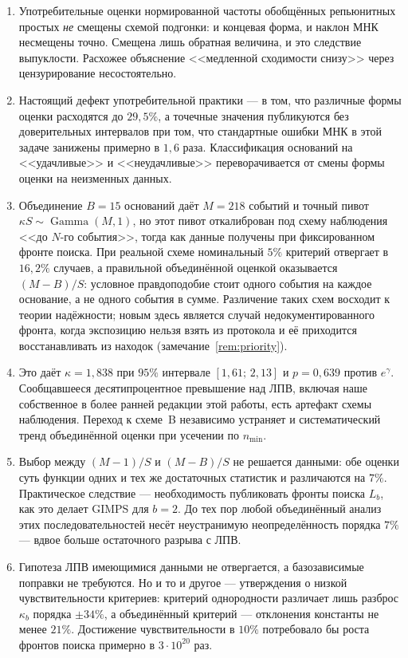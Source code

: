 \documentclass[11pt,a4paper]{article}
\theoremstyle{plain}
\theoremstyle{remark}
\newcommand{\eg}{e^{\gamma}}
\DeclareMathOperator{\Gam}{Gamma}
\begin{document}
\begin{enumerate}
\item Употребительные оценки нормированной частоты обобщённых репьюнитных простых
\emph{не} смещены схемой подгонки: и концевая форма, и наклон МНК несмещены точно.
Смещена лишь обратная величина, и это следствие выпуклости. Расхожее объяснение
<<медленной сходимости снизу>> через цензурирование несостоятельно.

\item Настоящий дефект употребительной практики --- в том, что различные формы оценки
расходятся до $29{,}5\%$, а точечные значения публикуются без доверительных интервалов
при том, что стандартные ошибки МНК в этой задаче занижены примерно в $1{,}6$ раза.
Классификация оснований на <<удачливые>> и <<неудачливые>> переворачивается от смены
формы оценки на неизменных данных.

\item Объединение $B=15$ оснований даёт $M=218$ событий и точный пивот
$\kappa S\sim\Gam(M,1)$, но этот пивот откалиброван под схему наблюдения <<до $N$-го
события>>, тогда как данные получены при фиксированном фронте поиска. При реальной
схеме номинальный $5\%$ критерий отвергает в $16{,}2\%$ случаев, а правильной
объединённой оценкой оказывается $(M-B)/S$: условное правдоподобие стоит
одного события на каждое основание, а не одного события в сумме. Различение
таких схем восходит к теории надёжности; новым здесь является случай
недокументированного фронта, когда экспозицию нельзя взять из протокола и её
приходится восстанавливать из находок (замечание~\ref{rem:priority}).

\item Это даёт $\kappa=1{,}838$ при $95\%$ интервале $[1{,}61;\,2{,}13]$ и
$p=0{,}639$ против $\eg$. Сообщавшееся десятипроцентное превышение над ЛПВ, включая
наше собственное в более ранней редакции этой работы, есть артефакт схемы наблюдения.
Переход к схеме~B независимо устраняет и систематический тренд объединённой оценки
при усечении по $n_{\min}$.

\item Выбор между $(M-1)/S$ и $(M-B)/S$ не решается данными: обе оценки суть функции
одних и тех же достаточных статистик и различаются на $7\%$. Практическое следствие ---
необходимость публиковать фронты поиска $L_b$, как это делает GIMPS для $b=2$.
До тех пор любой объединённый анализ этих последовательностей несёт неустранимую
неопределённость порядка $7\%$ --- вдвое больше остаточного разрыва с ЛПВ.

\item Гипотеза ЛПВ имеющимися данными не отвергается, а базозависимые поправки не
требуются. Но и то и другое --- утверждения о низкой чувствительности критериев:
критерий однородности различает лишь разброс $\kappa_b$ порядка $\pm34\%$, а
объединённый критерий --- отклонения константы не менее $21\%$. Достижение
чувствительности в $10\%$ потребовало бы роста фронтов поиска примерно в $3\cdot10^{20}$ раз.
\end{enumerate}
\end{document}
